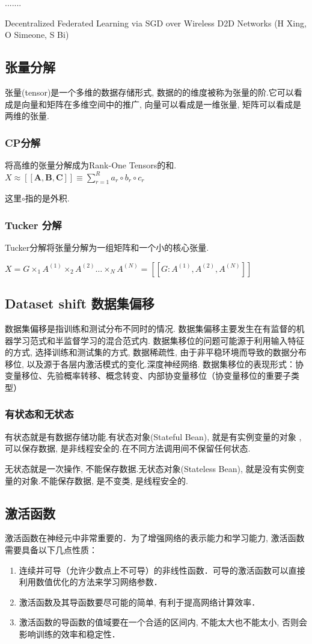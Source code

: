\documentclass[a4paper]{article}
\begin{document}
.......

Decentralized Federated Learning via SGD over Wireless D2D Networks (H Xing,  O Simeone,  S Bi)

\subsection{张量分解}
张量(tensor)是一个多维的数据存储形式, 数据的的维度被称为张量的阶.它可以看成是向量和矩阵在多维空间中的推广, 向量可以看成是一维张量, 矩阵可以看成是两维的张量.
\subsubsection{CP分解}
将高维的张量分解成为Rank-One Tensors的和.
$X \approx [ \!  [ \mathbf{A, B, C} ]\!] \equiv \sum_{r=1}^{R}a_r \circ b_r \circ c_r$

这里$\circ$指的是外积.
\subsubsection{Tucker 分解  }

Tucker分解将张量分解为一组矩阵和一个小的核心张量.

 $X = G \times_1 A^{(1)} \times_2  A^{(2)} \dots \times_N A^{(N)}= [\! [  G:A^{(1)},  A^{(2)},  A^{(N)}   ] \! ] $

\subsection{Dataset shift 数据集偏移}
数据集偏移是指训练和测试分布不同时的情况.
数据集偏移主要发生在有监督的机器学习范式和半监督学习的混合范式内.
数据集移位的问题可能源于利用输入特征的方式, 选择训练和测试集的方式, 数据稀疏性, 由于非平稳环境而导致的数据分布移位, 以及源于各层内激活模式的变化.深度神经网络.
数据集移位的表现形式：协变量移位、先验概率转移、概念转变、内部协变量移位（协变量移位的重要子类型）

\subsubsection{有状态和无状态}
有状态就是有数据存储功能.有状态对象(Stateful Bean), 就是有实例变量的对象 , 可以保存数据, 是非线程安全的.在不同方法调用间不保留任何状态.

无状态就是一次操作, 不能保存数据.无状态对象(Stateless Bean), 就是没有实例变量的对象.不能保存数据, 是不变类, 是线程安全的.
 
\subsection{激活函数}
激活函数在神经元中非常重要的．为了增强网络的表示能力和学习能力, 激活函数需要具备以下几点性质：
\begin{enumerate}
\item 连续并可导（允许少数点上不可导）的非线性函数．可导的激活函数可以直接利用数值优化的方法来学习网络参数．
\item 激活函数及其导函数要尽可能的简单, 有利于提高网络计算效率．
\item 激活函数的导函数的值域要在一个合适的区间内, 不能太大也不能太小, 否则会影响训练的效率和稳定性．
\end{enumerate}
\end{document}
